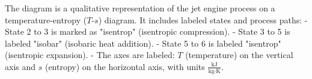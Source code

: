 The diagram is a qualitative representation of the jet engine process on a temperature-entropy (\( T \)-\( s \)) diagram. It includes labeled states and process paths:  
- State 2 to 3 is marked as "isentrop" (isentropic compression).  
- State 3 to 5 is labeled "isobar" (isobaric heat addition).  
- State 5 to 6 is labeled "isentrop" (isentropic expansion).  
- The axes are labeled: \( T \) (temperature) on the vertical axis and \( s \) (entropy) on the horizontal axis, with units \( \frac{\text{kJ}}{\text{kg·K}} \).